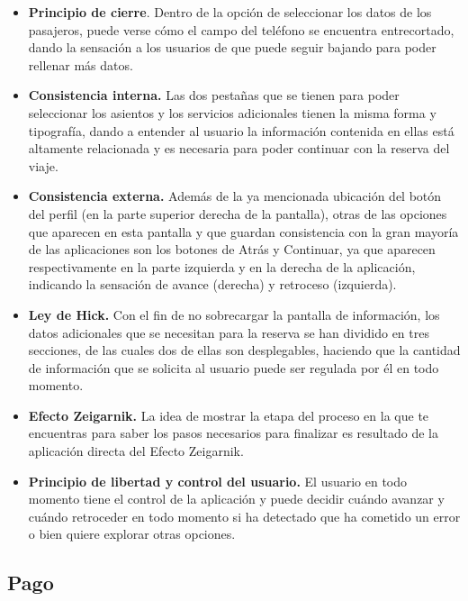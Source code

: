 \begin{itemize}
    \item \textbf{Principio de cierre}. Dentro de la opción de seleccionar los datos de los pasajeros, puede verse
        cómo el campo del teléfono se encuentra entrecortado, dando la sensación a los usuarios de que puede seguir
        bajando para poder rellenar más datos.
    \item \textbf{Consistencia interna.} Las dos pestañas que se tienen para poder seleccionar los asientos y los servicios
        adicionales tienen la misma forma y tipografía, dando a entender al usuario la información contenida en
        ellas está altamente relacionada y es necesaria para poder continuar con la reserva del viaje.
    \item \textbf{Consistencia externa.} Además de la ya mencionada ubicación del botón del perfil (en la parte superior
        derecha de la pantalla), otras de las opciones que aparecen en esta pantalla y que guardan consistencia
        con la gran mayoría de las aplicaciones son los botones de Atrás y Continuar, ya que aparecen respectivamente
        en la parte izquierda y en la derecha de la aplicación, indicando la sensación de avance (derecha) y retroceso
        (izquierda).
    \item \textbf{Ley de Hick.} Con el fin de no sobrecargar la pantalla de información, los datos adicionales que se necesitan
        para la reserva se han dividido en tres secciones, de las cuales dos de ellas son desplegables, haciendo que
        la cantidad de información que se solicita al usuario puede ser regulada por él en todo momento.
    \item \textbf{Efecto Zeigarnik.} La idea de mostrar la etapa del proceso en la que te encuentras para saber los pasos
        necesarios para finalizar es resultado de la aplicación directa del Efecto Zeigarnik.
    \item \textbf{Principio de libertad y control del usuario.} El usuario en todo momento tiene el control de la aplicación
        y puede decidir cuándo avanzar y cuándo retroceder en todo momento si ha detectado que ha cometido un error
        o bien quiere explorar otras opciones.
\end{itemize}

\subsection*{Pago}

